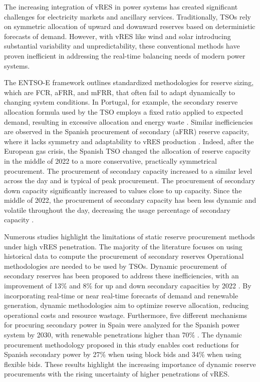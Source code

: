 The increasing integration of \gls{vRES} in power systems has created significant challenges for electricity markets and ancillary services. Traditionally, \gls{TSO}s rely on symmetric allocation of upward and downward reserves based on deterministic forecasts of demand. However, with \gls{vRES} like wind and solar introducing substantial variability and unpredictability, these conventional methods have proven inefficient in addressing the real-time balancing needs of modern power systems.\par
The \gls{ENTSO-E} framework \cite{handbook2009policy} outlines standardized methodologies for reserve sizing, which are \gls{FCR}, \gls{aFRR}, and \gls{mFRR}, that often fail to adapt dynamically to changing system conditions. In Portugal, for example, the secondary reserve allocation formula used by the \gls{TSO} employs a fixed ratio applied to expected demand, resulting in excessive allocation and energy waste \cite{Frade:19c,Perissi2022}. Similar inefficiencies are observed in the Spanish procurement of secondary (\gls{aFRR}) reserve capacity, where it lacks symmetry and adaptability to \gls{vRES} production \cite{Algarvio:24,Cardo-Miota:23}.
%
\textcolor[rgb]{0,0,0.5}{Indeed, after the European gas crisis, the Spanish TSO changed the allocation of reserve capacity in the middle of 2022 to a more conservative, practically symmetrical procurement. The procurement of secondary capacity increased to a similar level across the day and is typical of peak procurement. The procurement of secondary down capacity significantly increased to values close to up capacity. Since the middle of 2022, the procurement of secondary capacity has been less dynamic and volatile throughout the day, decreasing the usage percentage of secondary capacity \cite{Algarvio:24,Cardo-Miota:23}.}
%

Numerous studies highlight the limitations of static reserve procurement methods under high vRES penetration.
%
The majority of the literature focuses on using historical data to compute the procurement of secondary reserves \cite{Knorr:19,Frade2019_market,Papavasiliou:21}
%
Operational methodologies are needed to be used by TSOs.
%
Dynamic procurement of secondary reserves has been proposed to address these inefficiencies, with an improvement of 13\% and 8\% for up and down secondary capacities by 2022 \cite{Algarvio2024}. By incorporating real-time or near real-time forecasts of demand and renewable generation, dynamic methodologies aim to optimize reserve allocation, reducing operational costs and resource wastage.
%
Furthermore, five different mechanisms for procuring secondary power in Spain were analyzed for the Spanish power system by 2030, with renewable penetrations higher than 70\% \cite{Algarvio:24}. The dynamic procurement methodology proposed in this study enables cost reductions for Spanish secondary power by 27\% when using block bids and 34\% when using flexible bids. These results highlight the increasing importance of dynamic reserve procurements with the rising uncertainty of higher penetrations of \gls{vRES}.  


